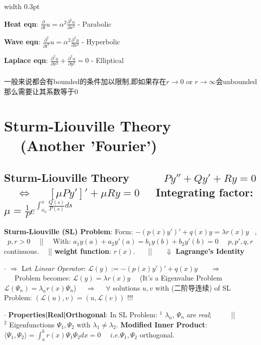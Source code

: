 \documentclass[8pt]{extarticle}
\begin{document}
\hfill
\vrule width 0.3pt
\hfill
\begin{minipage}[t]{0.25\textwidth}

    \textbf{Heat eqn}: $\frac{\partial}{\partial t}u=\alpha^2\frac{\partial^2u}{\partial x^2}$ - Parabolic

    \textbf{Wave eqn}: $\frac{\partial^2}{\partial t^2}u=\alpha^2\frac{\partial^2u}{\partial x^2}$ - Hyperbolic

    \textbf{Laplace eqn}: $\frac{\partial^2u}{\partial x^2}+\frac{\partial^2u}{\partial y^2}=0$ - Elliptical \\ \\

    一般来说都会有bounded的条件加以限制,即如果存在$r\to0$ or $r\to\infty$会unbounded那么需要让其系数等于0
\end{minipage}


\section{Sturm-Liouville Theory \ \ (Another 'Fourier')}

\vspace{-5pt}
\subsection{Sturm-Liouville Theory \ \ \ \ \ {\tiny $Py''+Qy'+Ry=0$ \ \ $\Leftrightarrow$ \ \ $[\mu Py']'+\mu Ry=0$ \ \ Integrating factor:$\mu=\frac{1}{P}e^{\int_{x_0}^{x}\frac{Q(s)}{P(s)}ds}$}}

\textbf{Sturm-Liouville (SL) Problem}: Form: $-(p(x)y')'+q(x)y=\lambda r(x)y$ \ , \ $p,r>0$ \ \ || \ \ With: $a_1y(a)+a_2y'(a)=b_1y(b)+b_2y'(b)=0$ \ \ $p,p',q,r$ continuous. \ \ || \textbf{weight function}: $r(x)$. \ \ \ || \ \ \ {\tiny $\Downarrow$ \textbf{Lagrange's Identity}}

$\cdot$ $\Rightarrow$ Let \textit{Linear Operator}: $\mathcal{L}(y):=-(p(x)y')'+q(x)y$ \ \ \ $\Rightarrow$ \ \ \ Problem becomes: $\mathcal{L}(y)=\lambda r(x)y$ \ \ {\tiny (It's a Eigenvalue Problem $\mathcal{L}(\Psi_n)=\lambda_n r(x)\Psi_n$)} \ \ $\Rightarrow$ \ \ $\forall$ solutions $u,v$ with (二阶导连续) of SL Problem: $(\mathcal{L}(u),v)=(u,\mathcal{L}(v))$ !!!

$\cdot$ \textbf{Properties|Real|Orthogonal}: In SL Problem: $^1$ $\lambda_n$, $\Psi_n$ are \textit{real}; \ \ \ \ \ || \ \ \ \ \ $^2$ Eigenfunctions $\Psi_1,\Psi_2$ with $\lambda_1\ne\lambda_2$. \textbf{Modified Inner Product}: $\langle \Psi_1,\Psi_2 \rangle=\int^b_a r(x)\Psi_1\Psi_2 dx=0$ \ \ {\tiny $i.e.\Psi_1,\Psi_2$ orthogonal.}
\end{document}
